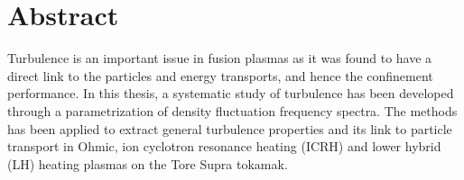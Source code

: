 \chapter*{Abstract}




Turbulence is an important issue in fusion plasmas as it was found to have a direct link to the particles and energy transports, and hence the confinement performance. In this thesis, a systematic study of turbulence has been developed through a parametrization of density fluctuation frequency spectra. The methods has been applied to extract general turbulence properties and its link to particle transport in Ohmic, ion cyclotron resonance heating (ICRH) and lower hybrid (LH) heating plasmas on the Tore Supra tokamak.

